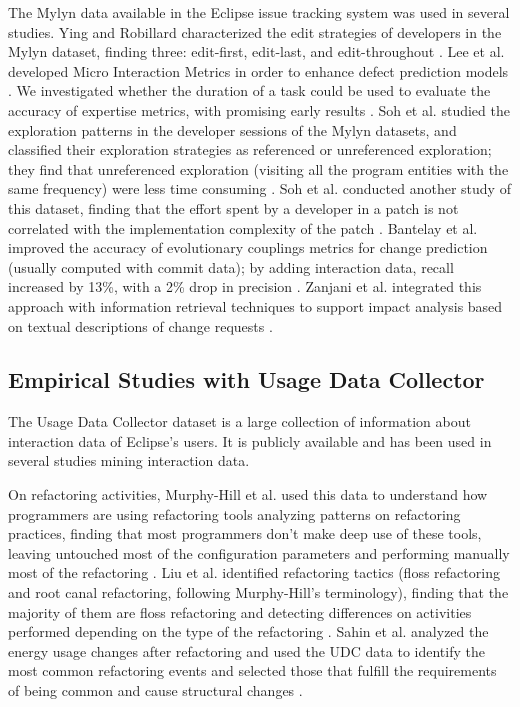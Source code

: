 \documentclass[times]{smrauth}
\begin{document}
The Mylyn data available in the Eclipse issue tracking system was used in several studies. Ying and Robillard characterized the edit strategies of developers in the Mylyn dataset, finding three: edit-first, edit-last, and edit-throughout \cite{YR11}. Lee et al. developed Micro Interaction Metrics in order to enhance defect prediction models \cite{LJD11}. We investigated whether the duration of a task could be used to evaluate the accuracy of expertise metrics, with promising early results \cite{RD13}. Soh et al. studied the exploration patterns in the developer sessions of the Mylyn datasets, and classified their exploration strategies as referenced or unreferenced exploration; they find that unreferenced exploration (visiting all the program entities with the same frequency) were less time consuming \cite{SKGAA13}. Soh et al. conducted another study of this dataset, finding that the effort spent by a developer in a patch is not correlated with the implementation complexity of the patch \cite{SKGA13}. Bantelay et al. improved the accuracy of evolutionary couplings metrics for change prediction (usually computed with commit data); by adding interaction data, recall increased by 13\%, with a 2\% drop in precision \cite{BZK13}. Zanjani et al. integrated this approach with information retrieval techniques to support impact analysis based on textual descriptions of change requests \cite{ZSK14}.

\subsection{Empirical Studies with Usage Data Collector}
The Usage Data Collector dataset is a large collection of information about interaction data of Eclipse's users. It is publicly available and has been used in several studies mining interaction data. 

On refactoring activities, Murphy-Hill et al. used this data to understand how programmers are using refactoring tools analyzing patterns on refactoring practices, finding that most programmers don't make deep use of these tools, leaving untouched most of the configuration parameters and performing manually most of the refactoring  \cite{MPB12}. Liu et al. identified refactoring tactics (floss refactoring and root canal refactoring, following Murphy-Hill's terminology), finding that the majority of them are floss refactoring and detecting differences on activities performed depending on the type of the refactoring \cite{LGN12}. Sahin et al. analyzed the energy usage changes after refactoring and used the UDC data to identify the most common refactoring events and selected those that fulfill the requirements of being common and cause structural changes \cite{SPC14}. 
\end{document}

